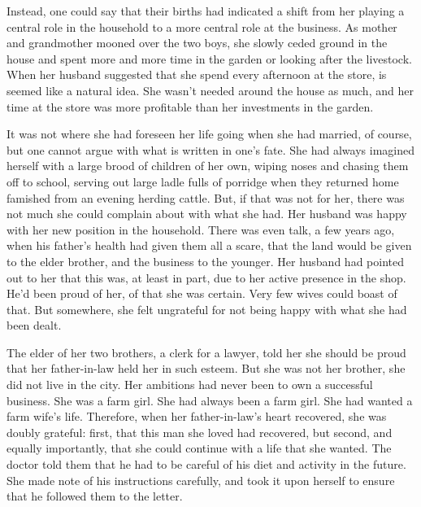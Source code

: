 \documentclass{article}
\begin{document}
Instead, one could say that their births had indicated a shift from her playing a central role in the household to a more central role at the business. As mother and grandmother mooned over the two boys, she slowly ceded ground in the house and spent more and more time in the garden or looking after the livestock. When her husband suggested that she spend every afternoon at the store, is seemed like a natural idea. She wasn't needed around the house as much, and her time at the store was more profitable than her investments in the garden. 

It was not where she had foreseen her life going when she had married, of course, but one cannot argue with what is written in one's fate. She had always imagined herself with a large brood of children of her own, wiping noses and chasing them off to school, serving out large ladle fulls of porridge when they returned home famished from an evening herding cattle. But, if that was not for her, there was not much she could complain about with what she had. Her husband was happy with her new position in the household. There was even talk, a few years ago, when his father's health had given them all a scare, that the land would be given to the elder brother, and the business to the younger. Her husband had pointed out to her that this was, at least in part, due to her active presence in the shop. He'd been proud of her, of that she was certain. Very few wives could boast of that. But somewhere, she felt ungrateful for not being happy with what she had been dealt.

The elder of her two brothers, a clerk for a lawyer, told her she should be proud that her father-in-law held her in such esteem. But she was not her brother, she did not live in the city. Her ambitions had never been to own a successful business. She was a farm girl. She had always been a farm girl. She had wanted a farm wife's life. Therefore, when her father-in-law's heart recovered, she was doubly grateful: first, that this man she loved had recovered, but second, and equally importantly, that she could continue with a life that she wanted. The doctor told them that he had to be careful of his diet and activity in the future. She made note of his instructions carefully, and took it upon herself to ensure that he followed them to the letter.
\end{document}
